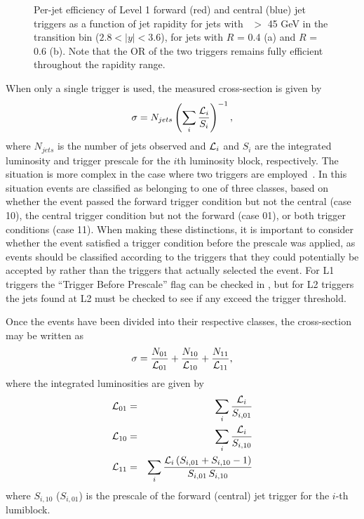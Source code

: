 \begin{figure}[tb]
\centering 
{}
\caption[Trigger efficiency vs. $y$]{Per-jet efficiency of Level 1 forward (red) and central (blue) jet triggers as a function of jet rapidity for jets with \pt~$>$ 45 GeV in the transition bin ($2.8 < |y| < 3.6$), for jets with $R$ = 0.4 (a) and $R$ = 0.6 (b). Note that the OR of the two triggers remains fully efficient throughout the rapidity range.}
\label{fig_transbin_rapidity_coverage}
\end{figure}

When only a single trigger is used, the measured cross-section is given by
\begin{equation}
\sigma = N_{jets}\left(\sum_i\frac{{\cal L}_i}{S_i}\right)^{-1},
\end{equation}
where $N_{jets}$ is the number of jets observed and ${\cal L}_i$ and $S_i$ are the integrated luminosity and trigger prescale for the $i$th luminosity block, respectively. The situation is more complex in the case where two triggers are employed~\cite{combining_triggers}. In this situation events are classified as belonging to one of three classes, based on whether the event passed the forward trigger condition but not the central (case 10), the central trigger condition but not the forward (case 01), or both trigger conditions (case 11). When making these distinctions, it is important to consider whether the event satisfied a trigger condition before the prescale was applied, as events should be classified according to the triggers that they could potentially be accepted by rather than the triggers that actually selected the event. For L1 triggers the ``Trigger Before Prescale'' flag can be checked in \athena, but for L2 triggers the jets found at L2 must be checked to see if any exceed the trigger threshold.

Once the events have been divided into their respective classes, the cross-section may be written as \begin{equation}
\sigma =  \frac{N_\mathrm{01}}{{\cal L}_\mathrm{01}} + \frac{N_\mathrm{10}}{{\cal L}_\mathrm{10}} +\frac{N_\mathrm{11}}{{\cal L}_\mathrm{11}},
\end{equation}
where the integrated luminosities are given by
\begin{eqnarray}
{\cal L}_\mathrm{01} &=& \sum_i\frac{{\cal L}_i}{S_{i\mathrm{,01}}}\\
{\cal L}_\mathrm{10} &=& \sum_i\frac{{\cal L}_i}{S_{i\mathrm{,10}}}\\
{\cal L}_\mathrm{11} &=& \sum_i\frac{{\cal L}_i \left(S_{i\mathrm{,01}} + S_{i\mathrm{,10}} - 1\right) }{ S_{i\mathrm{,01}} \, S_{i\mathrm{,10}}}
\end{eqnarray}
where $S_{i\mathrm{,10}}$ ($S_{i\mathrm{,01}}$) is the prescale of the forward (central) jet trigger for the $i$-th lumiblock.



